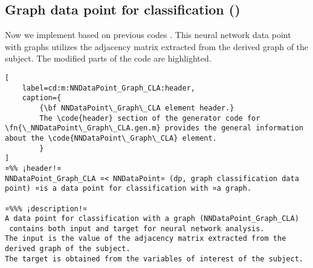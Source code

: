\documentclass{tufte-handout}
\begin{document}
\clearpage

\subsection{Graph data point for classification ()}

Now we implement  based on previous codes .
This neural network data point with graphs utilizes the adjacency matrix extracted from the derived graph of the subject. 
The modified parts of the code are highlighted.

\begin{lstlisting}[
	label=cd:m:NNDataPoint_Graph_CLA:header,
	caption={
		{\bf NNDataPoint\_Graph\_CLA element header.}
		The \code{header} section of the generator code for \fn{\_NNDataPoint\_Graph\_CLA.gen.m} provides the general information about the \code{NNDataPoint\_Graph\_CLA} element.
		}
]
¤%% ¡header!¤
NNDataPoint_Graph_CLA ¤< NNDataPoint¤ (dp, graph classification data point) ¤is a data point for classification with ¤a graph.

¤%%% ¡description!¤
A data point for classification with a graph (NNDataPoint_Graph_CLA) 
 contains both input and target for neural network analysis.
The input is the value of the adjacency matrix extracted from the derived graph of the subject.
The target is obtained from the variables of interest of the subject.
\end{lstlisting}
\end{document}
